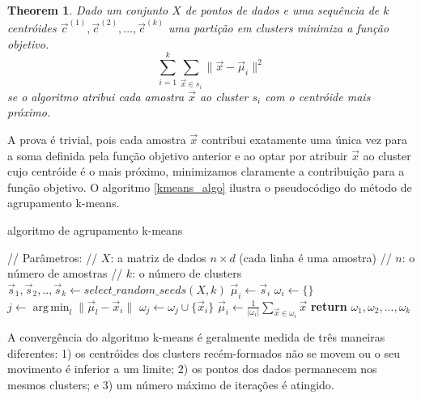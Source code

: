 \documentclass[sn-mathphys,Numbered]{sn-jnl}%
\theoremstyle{thmstyleone}%
\newtheorem{theorem}{Theorem}%
\theoremstyle{thmstyletwo}%
\theoremstyle{thmstylethree}%
\DeclareMathOperator*{\argmin}{arg\,min}
\begin{document}
\vspace{0.5cm}
\begin{theorem}
    Dado um conjunto $X$ de pontos de dados e uma sequência de $k$ centróides $\vec{c}^{(1)}, \vec{c}^{(2)}, ..., \vec{c }^{(k)}$ uma partição em clusters minimiza a função objetivo.
	\begin{equation}
		\sum_{i=1}^{k} \sum_{\vec{x} \in s_i} \lVert \vec{x} - \vec{\mu}_i  \rVert^2
    \end{equation}
    se o algoritmo atribui cada amostra $\vec{x}$ ao cluster $s_i$ com o centróide mais próximo.
\end{theorem}
\vspace{0.5cm}

A prova é trivial, pois cada amostra $\vec{x}$ contribui exatamente uma única vez para a soma definida pela função objetivo anterior e ao optar por atribuir $\vec{x}$ ao cluster cujo centróide é o mais próximo, minimizamos claramente a contribuição para a função objetivo. O algoritmo \ref{kmeans_algo} ilustra o pseudocódigo do método de agrupamento k-means.

\begin{algorithm}[H]
\caption{algoritmo de agrupamento k-means}\label{kmeans_algo}
\begin{algorithmic}
\State // Parâmetros:
\State // $X$: a matriz de dados $n \times d$ (cada linha é uma amostra)
\State // $n$: o número de amostras
\State // $k$: o número de clusters
\State $\vec{s}_1, \vec{s}_2, .., \vec{s}_k \gets select\_random\_seeds(X, k)$	
	\State $\vec{\mu}_i \gets \vec{s}_i$		
\EndFor
{}
        \State $\omega_i \gets \{ \}$		
	\EndFor
		\State $j \gets \argmin_l \lVert \vec{\mu}_l - \vec{x}_i \rVert$   
        \State $\omega_j \gets \omega_j \cup \{ \vec{x}_i \} $	
	\EndFor
		\State $\vec{\mu}_i \gets \frac{1}{\lvert \omega_i \rvert}\sum_{\vec{x} \in \omega_i} \vec{x}$ 
	\EndFor
\EndWhile 
\State \textbf{return} $\omega_1, \omega_2, ..., \omega_k$	
\EndFunction
\end{algorithmic}
\end{algorithm}

A convergência do algoritmo k-means é geralmente medida de três maneiras diferentes: 1) os centróides dos clusters recém-formados não se movem ou o seu movimento é inferior a um limite; 2) os pontos dos dados permanecem nos mesmos clusters; e 3) um número máximo de iterações é atingido.
\end{document}
